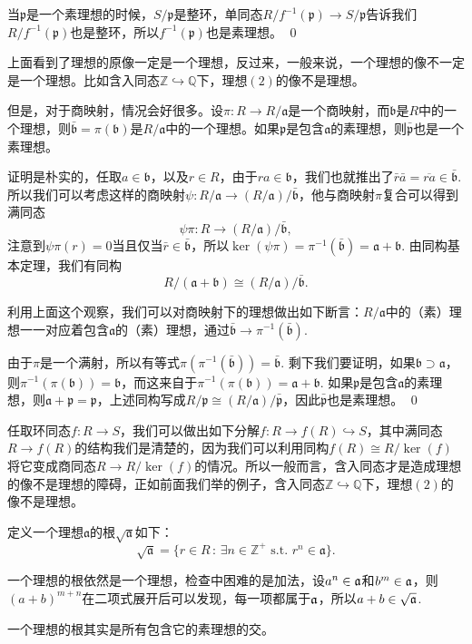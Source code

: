 	当$\mathfrak{p}$是一个素理想的时候，$S/\mathfrak{p}$是整环，单同态$R/f^{-1}(\mathfrak{p})\to S/\mathfrak{p}$告诉我们$R/f^{-1}(\mathfrak{p})$也是整环，所以$f^{-1}(\mathfrak{p})$也是素理想。
\qed

\para 上面看到了理想的原像一定是一个理想，反过来，一般来说，一个理想的像不一定是一个理想。比如含入同态$\mathbb{Z}\hookrightarrow \mathbb{Q}$下，理想$(2)$的像不是理想。

但是，对于商映射，情况会好很多。设$\pi:R\to R/\mathfrak{a}$是一个商映射，而$\mathfrak{b}$是$R$中的一个理想，则$\bar{\mathfrak{b}}=\pi(\mathfrak{b})$是$R/\mathfrak{a}$中的一个理想。如果$\mathfrak{p}$是包含$\mathfrak{a}$的素理想，则$\bar{\mathfrak{p}}$也是一个素理想。

证明是朴实的，任取$a\in \mathfrak{b}$，以及$r \in R$，由于$ra\in \mathfrak{b}$，我们也就推出了$\bar{r}\bar{a}=\overline{ra}\in \bar{\mathfrak{b}}$. 所以我们可以考虑这样的商映射$\psi: R/\mathfrak{a}\to (R/\mathfrak{a})/\bar{\mathfrak{b}}$，他与商映射$\pi$复合可以得到满同态
\[
	\psi\pi:R\to (R/\mathfrak{a})/\bar{\mathfrak{b}},
\]
注意到$\psi\pi(r)=0$当且仅当$\bar{r}\in \bar{\mathfrak{b}}$，所以$\ker(\psi\pi)=\pi^{-1}(\bar{\mathfrak{b}})=\mathfrak{a}+\mathfrak{b}$. 由同构基本定理，我们有同构
\[
	R/(\mathfrak{a}+\mathfrak{b})\cong (R/\mathfrak{a})/\bar{\mathfrak{b}}.
\]

\para 利用上面这个观察，我们可以对商映射下的理想做出如下断言：$R/\mathfrak{a}$中的（素）理想一一对应着包含$\mathfrak{a}$的（素）理想，通过$\bar{\mathfrak{b}}\to \pi^{-1}(\bar{\mathfrak{b}})$.

\proof 
	由于$\pi$是一个满射，所以有等式$\pi(\pi^{-1}(\bar{\mathfrak{b}}))=\bar{\mathfrak{b}}$. 剩下我们要证明，如果$\mathfrak{b}\supset \mathfrak{a}$，则$\pi^{-1}(\pi(\mathfrak{b}))=\mathfrak{b}$，而这来自于$\pi^{-1}(\pi(\mathfrak{b}))=\mathfrak{a}+\mathfrak{b}$. 如果$\mathfrak{p}$是包含$\mathfrak{a}$的素理想，则$\mathfrak{a}+\mathfrak{p}=\mathfrak{p}$，上述同构写成$R/\mathfrak{p}\cong (R/\mathfrak{a})/\bar{\mathfrak{p}}$，因此$\bar{\mathfrak{p}}$也是素理想。
\qed

\para 任取环同态$f:R\to S$，我们可以做出如下分解$f:R\to f(R)\hookrightarrow S$，其中满同态$R\to f(R)$的结构我们是清楚的，因为我们可以利用同构$f(R)\cong R/\ker(f)$将它变成商同态$R\to R/\ker(f)$的情况。所以一般而言，含入同态才是造成理想的像不是理想的障碍，正如前面我们举的例子，含入同态$\mathbb{Z}\hookrightarrow \mathbb{Q}$下，理想$(2)$的像不是理想。

\para 定义一个理想$\mathfrak{a}$的根$\sqrt{\mathfrak{a}}$如下：
\[
	\sqrt{\mathfrak{a}}=\{r\in R\,:\,\exists n\in \mathbb{Z}^+\text{ s.t. }r^n\in \mathfrak{a}\}.
\]

一个理想的根依然是一个理想，检查中困难的是加法，设$a^n\in \mathfrak{a}$和$b^m\in \mathfrak{a}$，则$(a+b)^{m+n}$在二项式展开后可以发现，每一项都属于$\mathfrak{a}$，所以$a+b\in \sqrt{\mathfrak{a}}$.

一个理想的根其实是所有包含它的素理想的交。